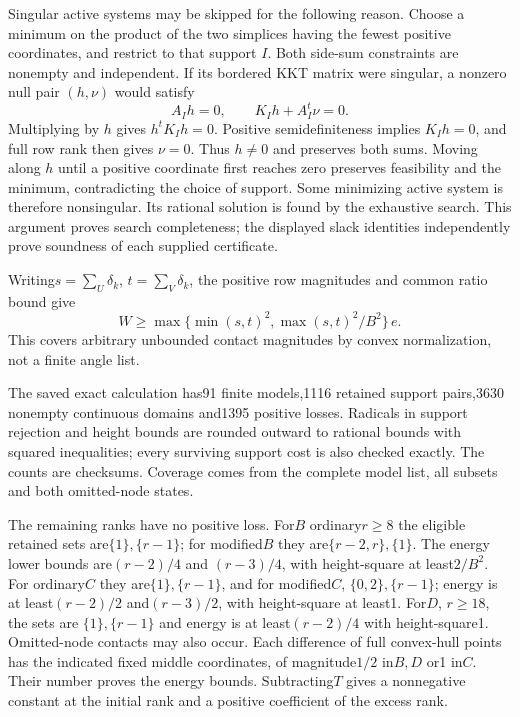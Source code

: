 \documentclass[11pt]{article}
\theoremstyle{remark}\newtheorem{remark}[theorem]{Remark}
\begin{document}
Singular active systems may be skipped for the following reason.
Choose a minimum on the product of the two simplices having the
fewest positive coordinates, and restrict to that support $I$.
Both side-sum constraints are nonempty and independent. If its
bordered KKT matrix were singular, a nonzero null pair $(h,\nu)$
would satisfy
\[
 A_Ih=0,\qquad K_Ih+A_I^t\nu=0.
\]
Multiplying by $h$ gives $h^tK_Ih=0$. Positive semidefiniteness
implies $K_Ih=0$, and full row rank then gives $\nu=0$.
Thus $h\ne0$ and preserves both sums. Moving along $h$ until a
positive coordinate first reaches zero preserves feasibility and
the minimum, contradicting the choice of support. Some minimizing
active system is therefore nonsingular. Its rational solution is
found by the exhaustive search. This argument proves search
completeness; the displayed slack identities independently prove
soundness of each supplied certificate.

Writing$s=\sum_U\delta_k$, $t=\sum_V\delta_k$, the positive row
magnitudes and common ratio bound give
\begin{equation}\label{eq:height-envelope}
 W\ge \max\{\min(s,t)^2,\max(s,t)^2/B^2\}\,e .
\end{equation}
This covers arbitrary unbounded contact magnitudes by convex
normalization, not a finite angle list.

The saved exact calculation has91 finite models,1116 retained
support pairs,3630 nonempty continuous domains and1395 positive
losses. Radicals in support rejection and height bounds are rounded
outward to rational bounds with squared inequalities; every surviving
support cost is also checked exactly. The counts are checksums.
Coverage comes from the complete model list, all subsets and both
omitted-node states.

The remaining ranks have no positive loss. For$B$ ordinary$r\ge8$
the eligible retained sets are$\{1\},\{r-1\}$; for modified$B$ they
are$\{r-2,r\},\{1\}$. The energy lower bounds are$(r-2)/4$ and
$(r-3)/4$, with height-square at least$2/B^2$.
For ordinary$C$ they are$\{1\},\{r-1\}$, and for modified$C$,
$\{0,2\},\{r-1\}$; energy is at least$(r-2)/2$ and$(r-3)/2$,
with height-square at least1. For$D$, $r\ge18$, the sets are
$\{1\},\{r-1\}$ and energy is at least$(r-2)/4$ with height-square1.
Omitted-node contacts may also occur. Each difference of full
convex-hull points has the indicated fixed middle coordinates,
of magnitude$1/2$ in$B,D$ or1 in$C$. Their number proves the
energy bounds. Subtracting$T$ gives a nonnegative constant at the
initial rank and a positive coefficient of the excess rank.
\end{document}
